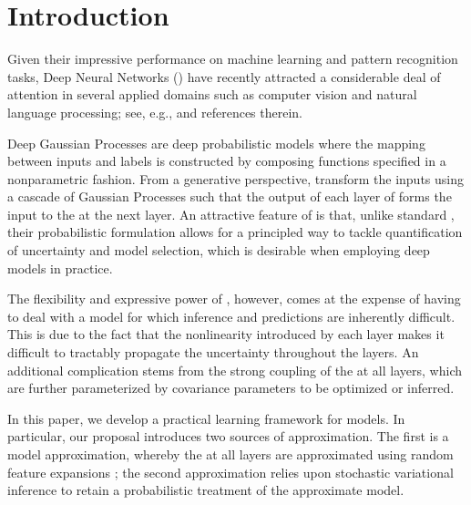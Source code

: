 \section{Introduction}

Given their impressive performance on machine learning and pattern recognition tasks, Deep Neural Networks () have recently attracted a considerable deal of attention in several applied domains such as computer vision and natural language 
processing; see, e.g., \citet{Lecun15Nature} and references therein.

Deep Gaussian Processes \citep[;][]{Damianou13} are deep probabilistic models where the mapping between inputs and labels is constructed by composing functions specified in a nonparametric fashion.
From a generative perspective,  transform the inputs using a cascade of Gaussian Processes \citep[;][]{Rasmussen06} such that the output of each layer of  forms the input to the  at the next layer.
An attractive feature of  is that, unlike standard , their probabilistic formulation allows for a principled way to tackle quantification of uncertainty and model selection, which is desirable when employing deep models in practice. %

The flexibility and expressive power of , however, comes at the expense of having to deal with a model for which inference and predictions are inherently difficult.
This is due to the fact that the nonlinearity introduced by each layer makes it difficult to tractably propagate the uncertainty throughout the layers.
An additional complication stems from the strong coupling of the  at all layers, which are further parameterized by covariance parameters to be optimized or inferred. 

In this paper, we develop a practical learning framework for \dgp models.
In particular, our proposal introduces two sources of approximation. %
The first is a model approximation, whereby the  at all layers are approximated using random feature expansions \citep{Rahimi08,Gredilla10}; the second approximation relies upon stochastic variational inference to retain a probabilistic treatment of the approximate \dgp model.

